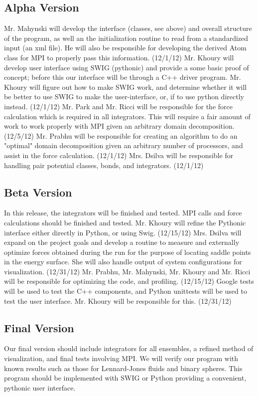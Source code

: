 \documentclass[10pt]{article}
\begin{document}
\subsection{Alpha Version}
Mr. Mahynski will develop the interface (classes, see above) and overall structure of the program, as well an the initialization routine to read from a standardized input (an xml file).  He will also be responsible for developing the derived Atom class for MPI to properly pass this information. (12/1/12)
Mr. Khoury will develop user interface using SWIG (pythonic) and provide a some basic proof of concept; before this our interface will be through a C++ driver program. Mr. Khoury will figure out how to make SWIG work, and determine whether it will be better to use SWIG to make the user-interface, or, if to use python directly instead. (12/1/12)
Mr. Park and Mr. Ricci will be responsible for the force calculation which is required in all integrators.  This will require a fair amount of work to work properly with MPI given an arbitrary domain decomposition. (12/5/12)
Mr. Prabhu will be responsible for creating an algorithm to do an "optimal" domain decomposition given an arbitrary number of processors, and assist in the force calculation.  (12/1/12)
Mrs. Dsilva will be responsible for handling pair potential classes, bonds, and integrators.  (12/1/12)
\subsection{Beta Version}
In this release, the integrators will be finished and tested.  MPI calls and force calculations should be finished and tested.
Mr. Khoury will refine the Pythonic interface either directly in Python, or using Swig.  (12/15/12)
Mrs. Dsilva will expand on the project goals and develop a routine to measure and externally optimize forces obtained during the run for the purpose of locating saddle points in the energy surface.  She will also handle output of system configurations for visualization.  (12/31/12)
Mr. Prabhu, Mr. Mahynski, Mr. Khoury and Mr. Ricci will  be responsible for optimizing the code, and profiling. (12/15/12)
Google tests will be used to test the C++ components, and Python unittests will be used to test the user interface. Mr. Khoury will be responsible for this. (12/31/12)
\subsection{Final Version}
Our final version should include integrators for all ensembles, a refined method of visualization, and final tests involving MPI.  We will verify our program with known results such as those for Lennard-Jones fluids and binary spheres.  This program should be implemented with SWIG or Python providing a convenient, pythonic user interface.
\end{document}
